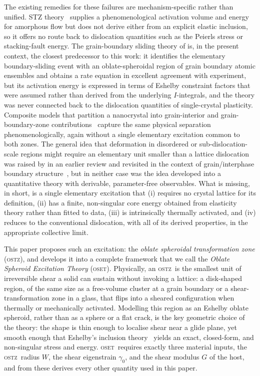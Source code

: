 \documentclass[3p]{elsarticle}
\newcommand{\OSTZ}{\textsc{ostz}}
\newcommand{\OSET}{\textsc{oset}}
\newcommand{\gz}{\gamma_0}
\begin{document}
The existing remedies for these failures are mechanism-specific rather
than unified. STZ theory~\citep{argon1979,falk-langer1998} supplies a
phenomenological activation volume and energy for amorphous flow but
does not derive either from an explicit elastic inclusion, so it
offers no route back to dislocation quantities such as the Peierls
stress or stacking-fault energy. The grain-boundary
sliding theory of \citet{pad-part1} is, in the present context, the
closest predecessor to this work: it identifies the elementary
boundary-sliding event with an oblate-spheroidal region of grain
boundary atomic ensembles and obtains a
rate equation in excellent agreement with experiment, but its
activation energy is expressed in terms of Eshelby constraint factors
that were assumed rather than derived from the underlying $I$-integrals,
and the theory was never connected back to the dislocation quantities
of single-crystal plasticity. Composite models that partition a
nanocrystal into grain-interior and grain-boundary-zone
contributions~\citep{baraiweng2009,li2021eshelby} capture the same physical
separation phenomenologically, again without a single elementary
excitation common to both zones. The general idea that deformation in
disordered or sub-dislocation-scale regions might require an
elementary unit smaller than a lattice dislocation was raised by
\citet{padgleiter2012} in an earlier
review and revisited in the context of
grain/interphase boundary structure~\citep{padgleiter2014}, but in
neither case was the idea developed into a quantitative theory with
derivable, parameter-free observables. What is missing, in short, is a single
elementary excitation that (i) requires no crystal lattice for its
definition, (ii) has a finite, non-singular core energy obtained from
elasticity theory rather than fitted to data, (iii) is intrinsically
thermally activated, and (iv) reduces to the conventional dislocation,
with all of its derived properties, in the appropriate collective
limit.

This paper proposes such an excitation: the \emph{oblate spheroidal
transformation zone} (\OSTZ), and develops it into a complete
framework that we call the \emph{Oblate Spheroid Excitation Theory}
(\OSET). Physically, an \OSTZ\ is the smallest unit of irreversible
shear a solid can sustain without invoking a lattice: a disk-shaped
region, of the same size as a free-volume cluster at a grain boundary
or a shear-transformation zone in a glass, that flips into a sheared
configuration when thermally or mechanically activated. Modelling
this region as an Eshelby oblate spheroid, rather than as a sphere or
a flat crack, is the key geometric choice of the theory: the shape is
thin enough to localise shear near a glide plane, yet smooth enough
that Eshelby's inclusion theory~\citep{eshelby1957,mura1987} yields an
exact, closed-form, and non-singular stress and energy. \OSET\
requires exactly three material inputs, the \OSTZ\ radius $W$, the
shear eigenstrain $\gz$, and the shear modulus $G$ of the host, and
from these derives every other quantity used in this paper.
\end{document}
